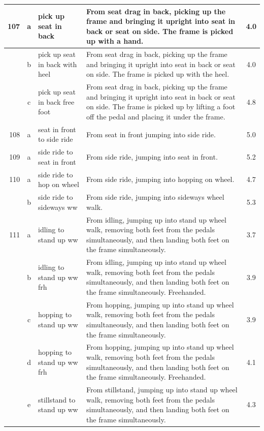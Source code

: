 \begin{longtable}{|r|c|p{4cm}|p{8cm}|c|}
\hline
107 & a & pick up seat in back  & From seat drag in back, picking up the frame and bringing it upright into seat in back or seat on side. The frame is picked up with a hand. & 4.0 \\ 
\hline
  & b & pick up seat in back with heel  & From seat drag in back, picking up the frame and bringing it upright into seat in back or seat on side. The frame is picked up with the heel. & 4.0 \\ 
\hline
  & c & pick up seat in back free foot  & From seat drag in back, picking up the frame and bringing it upright into seat in back or seat on side. The frame is picked up by lifting a foot off the pedal and placing it under the frame.  & 4.8 \\ 
\hline
108 & a & seat in front to side ride  & From seat in front jumping into side ride.  & 5.0 \\ 
\hline
109 & a & side ride to seat in front  & From side ride, jumping into seat in front. & 5.2 \\ 
\hline
110 & a & side ride to hop on wheel & From side ride, jumping into hopping on wheel.  & 4.7 \\ 
\hline
  & b & side ride to sideways ww  & From side ride, jumping into sideways wheel walk. & 5.3 \\ 
\hline
111 & a & idling to stand up ww & From idling, jumping up into stand up wheel walk, removing both feet from the pedals simultaneously, and then landing both feet on the frame simultaneously.  & 3.7 \\ 
\hline
  & b & idling to stand up ww frh & From idling, jumping up into stand up wheel walk, removing both feet from the pedals simultaneously, and then landing both feet on the frame simultaneously. Freehanded.  & 3.9 \\ 
\hline
  & c & hopping to stand up ww  & From hopping, jumping up into stand up wheel walk, removing both feet from the pedals simultaneously, and then landing both feet on the frame simultaneously. & 3.9 \\ 
\hline
  & d & hopping to stand up ww frh  & From hopping, jumping up into stand up wheel walk, removing both feet from the pedals simultaneously, and then landing both feet on the frame simultaneously. Freehanded. & 4.1 \\ 
\hline
  & e & stillstand to stand up ww & From stillstand, jumping up into stand up wheel walk, removing both feet from the pedals simultaneously, and then landing both feet on the frame simultaneously.  & 4.3 \\ 

\end{longtable}
